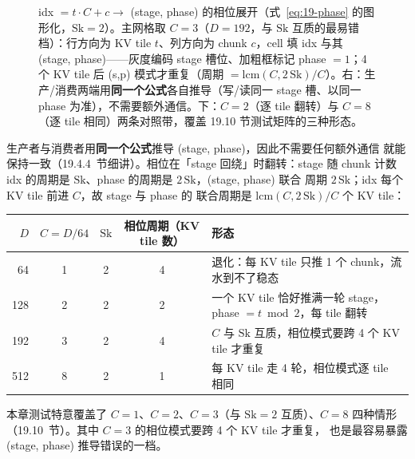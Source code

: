 \begin{figure}[H]
\caption{idx $= t\cdot C + c \to$ (stage, phase) 的相位展开（式~\ref{eq:19-phase} 的图形化，$\mathrm{Sk}{=}2$）。主网格取 $C{=}3$（$D{=}192$，与 $\mathrm{Sk}$ 互质的最易错档）：行方向为 KV tile $t$、列方向为 chunk $c$，cell 填 idx 与其 (stage, phase)——灰度编码 stage 槽位、加粗框标记 phase $=1$；4 个 KV tile 后 (s,p) 模式才重复（周期 $=\mathrm{lcm}(C,2\,\mathrm{Sk})/C$）。右：生产/消费两端用\textbf{同一个公式}各自推导（写/读同一 stage 槽、以同一 phase 为准），不需要额外通信。下：$C{=}2$（逐 tile 翻转）与 $C{=}8$（逐 tile 相同）两条对照带，覆盖 19.10 节测试矩阵的三种形态。}
\label{fig:19-phase-idx}
\end{figure}

生产者与消费者用\textbf{同一个公式}推导 (stage, phase)，因此不需要任何额外通信
就能保持一致（19.4.4~节细讲）。相位在「stage 回绕」时翻转：stage 随 chunk 计数
idx 的周期是 $\mathrm{Sk}$、phase 的周期是 $2\,\mathrm{Sk}$，(stage, phase) 联合
周期 $2\,\mathrm{Sk}$；idx 每个 KV tile 前进 $C$，故 stage 与 phase 的
联合周期是 $\mathrm{lcm}(C, 2\,\mathrm{Sk}) / C$ 个 KV tile：

\begin{center}
\begin{tabular}{rcccl}
\toprule
$D$ & $C = D/64$ & $\mathrm{Sk}$ & 相位周期（KV tile 数） & 形态 \\
\midrule
64 & 1 & 2 & 4 & 退化：每 KV tile 只推 1 个 chunk，流水到不了稳态 \\
128 & 2 & 2 & 2 & 一个 KV tile 恰好推满一轮 stage，phase $= t \bmod 2$，每 tile 翻转 \\
192 & 3 & 2 & 4 & $C$ 与 $\mathrm{Sk}$ 互质，相位模式要跨 4 个 KV tile 才重复 \\
512 & 8 & 2 & 1 & 每 KV tile 走 4 轮，相位模式逐 tile 相同 \\
\bottomrule
\end{tabular}
\end{center}

本章测试特意覆盖了 $C=1$、$C=2$、$C=3$（与 $\mathrm{Sk}{=}2$ 互质）、$C=8$
四种情形（19.10~节）。其中 $C=3$ 的相位模式要跨 4 个 KV tile 才重复，
也是最容易暴露 (stage, phase) 推导错误的一档。

